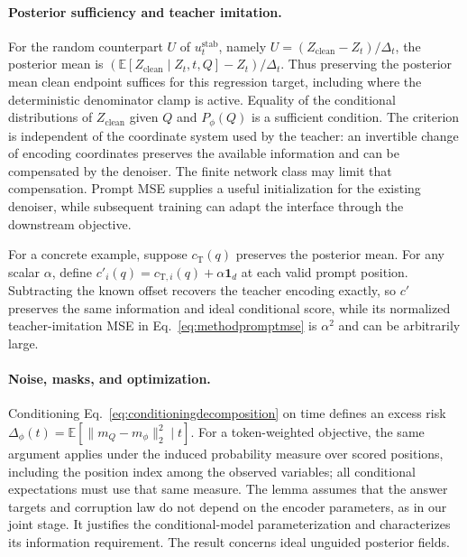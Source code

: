 \documentclass[11pt,letterpaper]{article}
\newcommand{\E}{\mathbb{E}}
\begin{document}
\paragraph{Posterior sufficiency and teacher imitation.}
For the random counterpart $U$ of $u_t^{\mathrm{stab}}$, namely $U=(Z_{\mathrm{clean}}-Z_t)/\Delta_t$, the posterior mean is $(\E[Z_{\mathrm{clean}}\mid Z_t,t,Q]-Z_t)/\Delta_t$. Thus preserving the posterior mean clean endpoint suffices for this regression target, including where the deterministic denominator clamp is active. Equality of the conditional distributions of $Z_{\mathrm{clean}}$ given $Q$ and $P_\phi(Q)$ is a sufficient condition. The criterion is independent of the coordinate system used by the teacher: an invertible change of encoding coordinates preserves the available information and can be compensated by the denoiser. The finite network class may limit that compensation. Prompt MSE supplies a useful initialization for the existing denoiser, while subsequent training can adapt the interface through the downstream objective.

For a concrete example, suppose $c_{\mathrm T}(q)$ preserves the posterior mean. For any scalar $\alpha$, define $c'_i(q)=c_{\mathrm T,i}(q)+\alpha\mathbf 1_d$ at each valid prompt position. Subtracting the known offset recovers the teacher encoding exactly, so $c'$ preserves the same information and ideal conditional score, while its normalized teacher-imitation MSE in Eq.~\eqref{eq:methodpromptmse} is $\alpha^2$ and can be arbitrarily large.

\paragraph{Noise, masks, and optimization.}
Conditioning Eq.~\eqref{eq:conditioningdecomposition} on time defines an excess risk $\Delta_\phi(t)=\E[\|m_Q-m_\phi\|_2^2\mid t]$. For a token-weighted objective, the same argument applies under the induced probability measure over scored positions, including the position index among the observed variables; all conditional expectations must use that same measure. The lemma assumes that the answer targets and corruption law do not depend on the encoder parameters, as in our joint stage. It justifies the conditional-model parameterization and characterizes its information requirement. The result concerns ideal unguided posterior fields.
\end{document}
